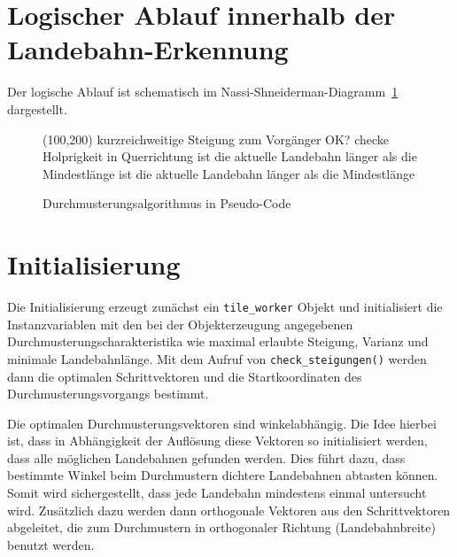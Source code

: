 \documentclass[10pt,a4paper]{report}
\begin{document}
\section{Logischer Ablauf innerhalb der Landebahn-Erkennung}

Der logische Ablauf ist schematisch im Nassi-Shneiderman-Diagramm~\ref{nasshnlogisch} dargestellt.

\clearpage
\begin{figure}
\begin{struktogramm}(100,200)
{kurzreichweitige Steigung zum Vorgänger OK?}{\sTrue}{\sFalse}
{checke Holprigkeit in Querrichtung}{\sTrue}{\sFalse}
\change
{}
{ist die aktuelle Landebahn länger als die Mindestlänge}{\sTrue}{\sFalse}
\change
{}
\ifend
\ifend
\change
{}
{ist die aktuelle Landebahn länger als die Mindestlänge}{\sTrue}{\sFalse}
\change
{}
\ifend
{}
\ifend
\forallinend
\end{struktogramm}
\caption{Durchmusterungsalgorithmus in Pseudo-Code}
\label{nasshnlogisch}
\end{figure}
\clearpage
\section{Initialisierung}

Die Initialisierung erzeugt zunächst ein \texttt{tile\_worker} Objekt und initialisiert die Instanzvariablen mit den bei der Objekterzeugung angegebenen Durchmusterungscharakteristika wie maximal erlaubte Steigung, Varianz und minimale Landebahnlänge.
Mit dem Aufruf von \texttt{check\_steigungen()} werden dann die optimalen Schrittvektoren und die Startkoordinaten des Durchmusterungsvorgangs bestimmt.

Die optimalen Durchmusterungsvektoren sind winkelabhängig. Die Idee hierbei ist, dass in Abhängigkeit der Auflösung diese Vektoren so initialisiert werden, dass alle möglichen Landebahnen gefunden werden. Dies führt dazu, dass bestimmte Winkel beim Durchmustern dichtere Landebahnen abtasten können. Somit wird sichergestellt, dass jede Landebahn mindestens einmal untersucht wird.
Zusätzlich dazu werden dann orthogonale Vektoren aus den Schrittvektoren abgeleitet, die zum Durchmustern in orthogonaler Richtung (Landebahnbreite) benutzt werden.
\end{document}
